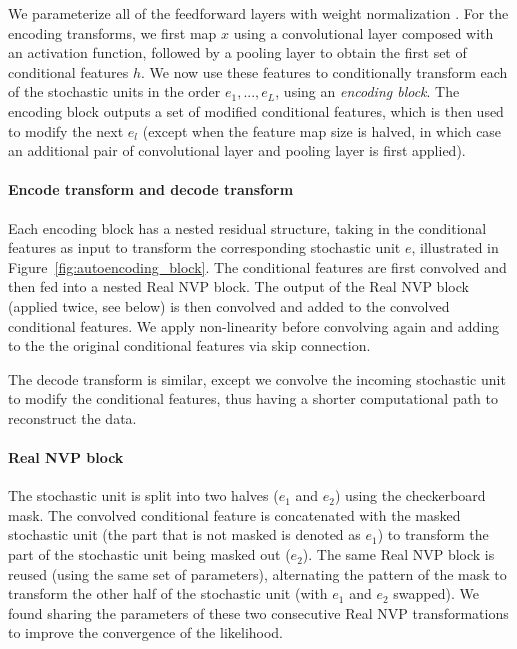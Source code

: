 \documentclass{article}
\begin{document}
We parameterize all of the feedforward layers with weight normalization \citep{salimans2016weight}. 
For the encoding transforms, we first map $x$ using a convolutional layer composed with an activation function, followed by a pooling layer to obtain the first set of conditional features $h$. 
We now use these features to conditionally transform each of the stochastic units in the order $e_1,...,e_L$, using an \emph{encoding block}.
The encoding block outputs a set of modified conditional features, which is then used to modify the next $e_l$ (except when the feature map size is halved, in which case an additional pair of convolutional layer and pooling layer is first applied).

 

\paragraph{Encode transform and decode transform} 
Each encoding block has a nested residual structure, taking in the conditional features as input to transform the corresponding stochastic unit $e$, illustrated in Figure~\ref{fig:autoencoding_block}. 
The conditional features are first convolved and then fed into a nested Real NVP block.   
The output of the Real NVP block (applied twice, see below) is then convolved and added to the convolved conditional features.
We apply non-linearity before convolving again and adding to the the original conditional features via skip connection.


The decode transform is similar, except we convolve the incoming stochastic unit to modify the conditional features, thus having a shorter computational path to reconstruct the data. 



\paragraph{Real NVP block}
The stochastic unit is split into two halves ($e_1$ and $e_2$) using the checkerboard mask. 
The convolved conditional feature is concatenated with the masked stochastic unit (the part that is not masked is denoted as $e_1$) to transform the part of the stochastic unit being masked out ($e_2$). 
The same Real NVP block is reused (using the same set of parameters), alternating the pattern of the mask to transform the other half of the stochastic unit (with $e_1$ and $e_2$ swapped). 
We found sharing the parameters of these two consecutive Real NVP transformations to improve the convergence of the likelihood. 
\end{document}
